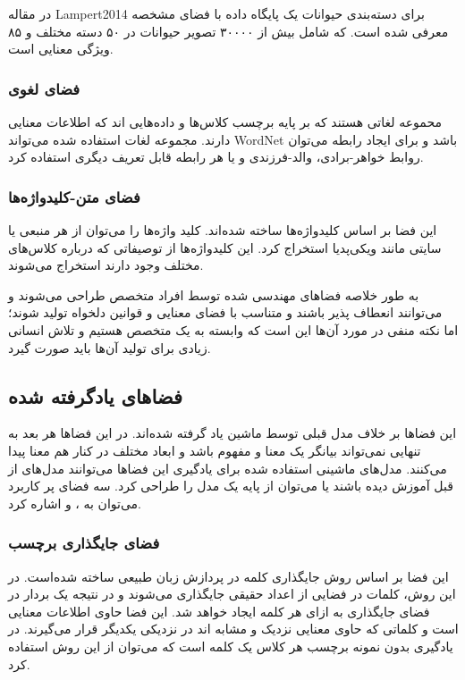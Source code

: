 در مقاله Lampert2014
\cite{Lampert2014}
برای دسته‌بندی حیوانات یک پایگاه داده با فضای مشخصه
معرفی شده است. که شامل بیش از ۳۰۰۰۰ تصویر حیوانات در ۵۰ دسته مختلف و ۸۵ ویژگی معنایی است.

\subsubsection{فضای لغوی}
محموعه لغاتی هستند که بر پایه برچسب کلاس‌ها و داده‌هایی اند که اطلاعات معنایی دارند. مجموعه لغات استفاده شده می‌تواند WordNet باشد و برای ایجاد رابطه می‌توان روابط خواهر-برادی، والد-فرزندی و یا هر رابطه‌ قابل تعریف دیگری استفاده کرد.

\subsubsection{‌فضای متن-کلیدواژه‌ها}
این فضا بر اساس کلید‌واژه‌ها ساخته شده‌اند. کلید واژه‌ها را می‌توان از هر منبعی یا سایتی مانند ویکی‌پدیا استخراج کرد. این کلیدواژه‌ها از توصیفاتی که درباره کلاس‌های مختلف وجود دارند استخراج می‌شوند.

به طور خلاصه فضا‌های مهندسی شده توسط افراد متخصص طراحی می‌شوند و می‌توانند انعطاف‌ پذیر باشند و متناسب با فضای معنایی و قوانین دلخواه تولید شوند؛ اما نکته منفی در مورد آن‌ها این است که وابسته به یک متخصص هستیم و تلاش انسانی زیادی برای تولید آن‌‌ها باید صورت گیرد.

\subsection{فضاهای یادگرفته شده}
این فضا‌ها بر خلاف مدل قبلی توسط ماشین یاد گرفته شده‌اند. در این فضا‌ها هر بعد به تنهایی نمی‌تواند بیانگر یک معنا و مفهوم باشد و ابعاد مختلف در کنار هم معنا پیدا می‌کنند. مدل‌های ماشینی استفاده شده برای یادگیری این فضا‌ها می‌توانند مدل‌های از قبل آموزش دیده باشند یا می‌توان از پایه یک مدل را طراحی کرد. سه فضای پر کاربرد می‌توان به
،
 و
اشاره کرد.

\subsubsection{‌فضای جایگذاری برچسب}
این فضا بر اساس روش جایگذاری کلمه در پردازش زبان طبیعی ساخته شده‌است. در این روش، کلمات در فضایی از اعداد حقیقی جایگذاری می‌شوند و در نتیجه یک بردار در فضای جایگذاری به ازای هر کلمه ایجاد خواهد شد. این فضا حاوی اطلاعات معنایی است و کلماتی که حاوی معنایی نزدیک و مشابه اند در نزدیکی یکدیگر قرار می‌گیرند.
در یادگیری بدون نمونه برچسب هر کلاس یک کلمه است که می‌توان از این روش استفاده کرد.


